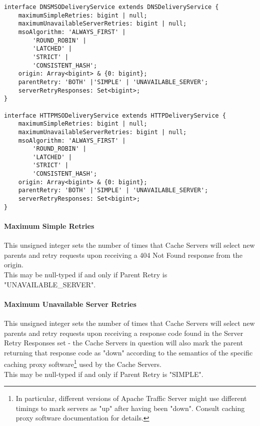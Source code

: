 \begin{codelisting}
\begin{verbatim}
interface DNSMSODeliveryService extends DNSDeliveryService {
	maximumSimpleRetries: bigint | null;
	maximumUnavailableServerRetries: bigint | null;
	msoAlgorithm: 'ALWAYS_FIRST' |
		'ROUND_ROBIN' |
		'LATCHED' |
		'STRICT' |
		'CONSISTENT_HASH';
	origin: Array<bigint> & {0: bigint};
	parentRetry: 'BOTH' |'SIMPLE' | 'UNAVAILABLE_SERVER';
	serverRetryResponses: Set<bigint>;
}

interface HTTPMSODeliveryService extends HTTPDeliveryService {
	maximumSimpleRetries: bigint | null;
	maximumUnavailableServerRetries: bigint | null;
	msoAlgorithm: 'ALWAYS_FIRST' |
		'ROUND_ROBIN' |
		'LATCHED' |
		'STRICT' |
		'CONSISTENT_HASH';
	origin: Array<bigint> & {0: bigint};
	parentRetry: 'BOTH' |'SIMPLE' | 'UNAVAILABLE_SERVER';
	serverRetryResponses: Set<bigint>;
}
\end{verbatim}
\end{codelisting}

\paragraph{Maximum Simple Retries}
This unsigned integer sets the number of times that Cache Servers will select
new parents and retry requests upon receiving a 404 Not Found response from the
origin.\\
This may be null-typed if and only if Parent Retry is "UNAVAILABLE\_SERVER".

\paragraph{Maximum Unavailable Server Retries}
This unsigned integer sets the number of times that Cache Servers will select
new parents and retry requests upon receiving a response code found in the
Server Retry Responses set - the Cache Servers in question will also mark the
parent returning that response code as "down" according to the semantics of the
specific caching proxy software\footnote{In particular, different versions of
Apache Traffic Server might use different timings to mark servers as "up" after
having been "down". Consult caching proxy software documentation for details.}
used by the Cache Servers.\\
This may be null-typed if and only if Parent Retry is "SIMPLE".

